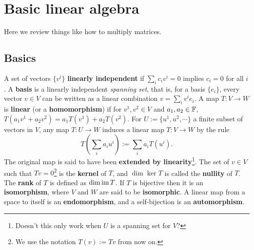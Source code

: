 
\section{Basic linear algebra} 
Here we review things like how to multiply matrices.
\subsection{Basics}
A set of vectors $\{v^i \} $ \textbf{linearly independent} if $\sum_{i}^{ } c_i v^i =0$ implies $c_i =0$ for all $i$. A \textbf{basis} is a linearly independent \emph{spanning set}, that is, for a basis $\{e_i \} $, every vector $v \in V$ can be written as a linear combination $v=\sum_i v^i e_i $. A map $T \colon V \to W$ is \textbf{linear} (or a \textbf{homomorphism}) if for $v^1,v^2 \in V$ and $a_1,a_2 \in \mathbb{F}$, $T(a_1v^1+a_2v^2)=a_1T(v^1)+a_2T(v^2)$. For $U:=\{u^1,u^2,\cdots \} $ a finite subset of vectors in $V$, any map $T \colon U \to W$ induces a linear map $T \colon V \to W$ by the rule\[
    T\left( \sum_i a_i u^i  \right) :=\sum _i a_i T(u^i ).
\] The original map is said to have been \textbf{extended by linearity}\footnote{Doesn't this only work when $U$ is a spanning set for $V$?}. The set of $v \in V$ such that $Tv=0$\footnote{We use the notation $T(v):=Tv$ from now on.} is the \textbf{kernel} of $T$, and $\dim \ker T$ is called the \textbf{nullity} of $T$. The \textbf{rank} of $T$ is defined as $\dim \operatorname{im} T$. If $T$ is bijective then it is an \textbf{isomorphism}, where $V$ and $W$ are said to be \textbf{isomorphic}. A linear map from a space to itself is an \textbf{endomorphism}, and a self-bijection is an \textbf{automorphism}.

